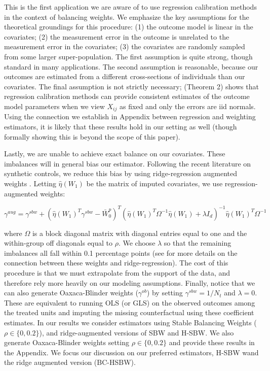 \documentclass[12pt]{article}
\begin{document}
This is the first application we are aware of to use regression calibration methods in the context of balancing weights. We emphasize the key assumptions for the theoretical groundings for this procedure: (1) the outcome model is linear in the covariates; (2) the measurement error in the outcome is unrelated to the measurement error in the covariates; (3) the covariates are randomly sampled from some larger super-population. The first assumption is quite strong, though standard in many applications. The second assumption is reasonable, because our outcomes are estimated from a different cross-sections of individuals than our covariates. The final assumption is not strictly necessary; \cite{gleser1992importance} (Theorem 2) shows that regression calibration methods can provide consistent estimates of the outcome model parameters when we view $X_{ij}$ as fixed and only the errors are iid normals. Using the connection we establish in Appendix between regression and weighting estimators, it is likely that these results hold in our setting as well (though formally showing this is beyond the scope of this paper).

Lastly, we are unable to achieve exact balance on our covariates. These imbalances will in general bias our estimator. Following the recent literature on synthetic controls, we reduce this bias by using ridge-regression augmented weights \cite{ben2018augmented}. Letting $\hat{\eta}(W_1)$ be the matrix of imputed covariates, we use regression-augmented weights:

$$
\gamma^{aug} = \gamma^{sbw} + (\hat{\eta}(W_1)^T\gamma^{sbw} - \bar{W}_0^p)^T(\hat{\eta}(W_1)^T\Omega^{-1}\hat{\eta}(W_1) + \lambda I_d)^{-1}\hat{\eta}(W_1)^T\Omega^{-1}
$$

where $\Omega$ is a block diagonal matrix with diagonal entries equal to one and the within-group off diagonals equal to $\rho$. We choose $\lambda$ so that the remaining imbalances all fall within 0.1 percentage points (see \cite{ben2018augmented} for more details on the connection between these weights and ridge-regression). The cost of this procedure is that we must extrapolate from the support of the data, and therefore rely more heavily on our modeling assumptions. Finally, notice that we can also generate Oaxaca-Blinder weights ($\gamma^{ob}$) by setting $\gamma^{sbw} = 1/N_t$ and $\lambda = 0$. These are equivalent to running OLS (or GLS) on the observed outcomes among the treated units and imputing the missing counterfactual using these coefficient estimates. In our results we consider estimators using Stable Balancing Weights ($\rho \in \{0, 0.2\}$), and ridge-augmented versions of SBW and H-SBW. We also generate Oaxaca-Blinder weights setting $\rho \in \{0, 0.2\}$ and provide these results in the Appendix. We focus our discussion on our preferred estimators, H-SBW wand the ridge augmented version (BC-HSBW).
\end{document}
